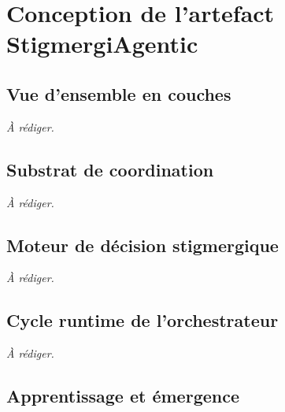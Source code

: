 \chapter{Conception de l'artefact StigmergiAgentic}\label{chap:conception}


\section{Vue d'ensemble en couches}\label{sec:conception-vue}

\textit{\`A r\'ediger.}

\section{Substrat de coordination}\label{sec:conception-substrat}

\textit{\`A r\'ediger.}

\section{Moteur de d\'ecision stigmergique}\label{sec:conception-decision}

\textit{\`A r\'ediger.}

\section{Cycle runtime de l'orchestrateur}\label{sec:conception-runtime}

\textit{\`A r\'ediger.}

\section{Apprentissage et \'emergence}\label{sec:conception-emergence}

